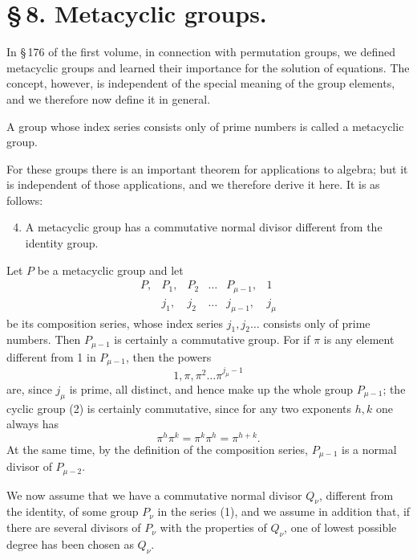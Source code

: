\documentclass[11pt]{article}
\begin{document}
\section*{\S\,8. Metacyclic groups.}

In \S\,176 of the first volume, in connection with permutation groups, we defined metacyclic groups and learned their importance for the solution of equations. The concept, however, is independent of the special meaning of the group elements, and we therefore now define it in general.

A group whose index series consists only of prime numbers is called a metacyclic group.

For these groups there is an important theorem for applications to algebra; but it is independent of those applications, and we therefore derive it here. It is as follows:
\begin{enumerate}[label=\Roman*.]
\setcounter{enumi}{3}
\item A metacyclic group has a commutative normal divisor different from the identity group.
\end{enumerate}

Let $P$ be a metacyclic group and let
\begin{equation}
\begin{array}{cccccc}
P,&P_1,&P_2&\ldots&P_{\mu-1},&1\\
&j_1,&j_2&\ldots&j_{\mu-1},&j_\mu
\end{array}
\tag{1}
\end{equation}
be its composition series, whose index series $j_1,j_2\ldots$ consists only of prime numbers. Then $P_{\mu-1}$ is certainly a commutative group. For if $\pi$ is any element different from 1 in $P_{\mu-1}$, then the powers
\begin{equation}
1,\pi,\pi^2\ldots \pi^{j_\mu-1}
\tag{2}
\end{equation}
are, since $j_\mu$ is prime, all distinct, and hence make up the whole group $P_{\mu-1}$; the cyclic group (2) is certainly commutative, since for any two exponents $h,k$ one always has
\[
\pi^h\pi^k=\pi^k\pi^h=\pi^{h+k}.
\]
At the same time, by the definition of the composition series, $P_{\mu-1}$ is a normal divisor of $P_{\mu-2}$.

We now assume that we have a commutative normal divisor $Q_\nu$, different from the identity, of some group $P_\nu$ in the series (1), and we assume in addition that, if there are several divisors of $P_\nu$ with the properties of $Q_\nu$, one of lowest possible degree has been chosen as $Q_\nu$.
\end{document}
